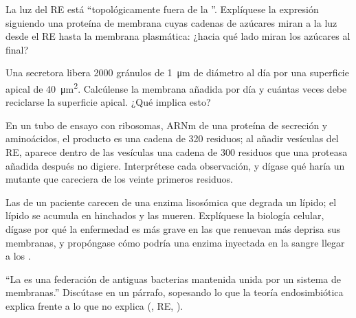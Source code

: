 \begin{exercise}[$\star\star$]\label{exo:b1:eukaryotic-cell:8}
La luz del RE está ``topológicamente fuera de la ''. Explíquese la
expresión siguiendo una proteína de membrana cuyas cadenas de azúcares miran
a la luz desde el RE hasta la membrana plasmática: ¿hacia qué lado miran los
azúcares al final?
\end{exercise}

\begin{exercise}[$\star\star$]\label{exo:b1:eukaryotic-cell:9}
Una  secretora libera \qty{2000}{} gránulos de \qty{1}{\micro m} de
diámetro al día por una superficie apical de \qty{40}{\micro m^2}.
Calcúlense la membrana añadida por día y cuántas veces debe reciclarse la
superficie apical. ¿Qué implica esto?
\end{exercise}

\begin{exercise}[$\star\star\star$]\label{exo:b1:eukaryotic-cell:10}
En un tubo de ensayo con ribosomas, ARNm de una proteína de secreción y
aminoácidos, el producto es una cadena de \qty{320}{} residuos; al añadir
vesículas del RE, aparece dentro de las vesículas una cadena de \qty{300}{}
residuos que una proteasa añadida después no digiere. Interprétese cada
observación, y dígase qué haría un mutante que careciera de los veinte
primeros residuos.
\end{exercise}

\begin{exercise}[$\star\star\star$]\label{exo:b1:eukaryotic-cell:11}
Las  de un paciente carecen de una enzima lisosómica que degrada un
lípido; el lípido se acumula en  hinchados y las  mueren.
Explíquese la biología celular, dígase por qué la enfermedad es más grave en
las  que renuevan más deprisa sus membranas, y propóngase cómo podría
una enzima inyectada en la sangre llegar a los .
\end{exercise}

\begin{exercise}[$\star\star\star$]\label{exo:b1:eukaryotic-cell:12}
``La  es una federación de antiguas bacterias mantenida
unida por un sistema de membranas.'' Discútase en un párrafo, sopesando lo
que la teoría endosimbiótica explica frente a lo que no explica (, RE,
).
\end{exercise}

